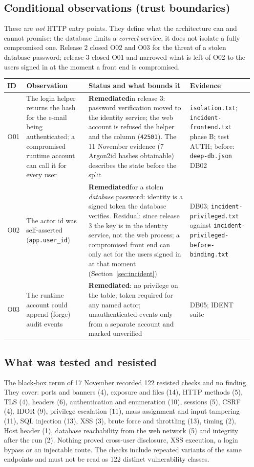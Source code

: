 \documentclass[10pt,a4paper]{article}
\newcommand{\code}[1]{\nolinkurl{#1}}
\newcommand{\fixed}{\textcolor{okgreen}{\textbf{Remediated}}}
\newcommand{\tcap}[1]{\captionof{table}{#1}\nopagebreak[4]\vspace{-3pt}}
\begin{document}
\subsection{Conditional observations (trust boundaries)}
These are \emph{not} HTTP entry points. They define what the architecture can and cannot promise: the database limits a \emph{correct} service, it does not isolate a fully compromised one. Release 2 closed O02 and O03 for the threat of a stolen database password; release 3 closed O01 and narrowed what is left of O02 to the users signed in at the moment a front end is compromised.
\tcap{Conditional observations O01--O03}
\begin{center}\small
\begin{tabularx}{\linewidth}{@{}L{0.9cm}YYL{3.4cm}@{}}
\toprule\textbf{ID} & \textbf{Observation} & \textbf{Status and what bounds it} & \textbf{Evidence}\\\midrule
O01 & The login helper returns the hash for the e-mail being authenticated; a compromised runtime account can call it for every user & \fixed in release 3: password verification moved to the identity service; the web account is refused the helper and the column (\code{42501}). The 11 November evidence (7 Argon2id hashes obtainable) describes the state before the split & \code{isolation.txt}; \code{incident-frontend.txt} phase B; test AUTH; before: \code{deep-db.json} DB02\\
O02 & The actor id was self-asserted (\code{app.user_id}) & \fixed for a stolen \emph{database} password: identity is a signed token the database verifies. Residual: since release 3 the key is in the identity service, not the web process; a compromised front end can only act for the users signed in at that moment (Section~\ref{sec:incident}) & DB03; \code{incident-privileged.txt} against \code{incident-privileged-before-binding.txt}\\
O03 & The runtime account could append (forge) audit events & \fixed: no privilege on the table; token required for any named actor; unauthenticated events only from a separate account and marked unverified & DB05; IDENT suite\\
\bottomrule\end{tabularx}\end{center}

\subsection{What was tested and resisted}
The black-box rerun of 17 November recorded 122 resisted checks and no finding. They cover: ports and banners (4), exposure and files (14), HTTP methods (5), TLS (4), headers (6), authentication and enumeration (10), sessions (5), CSRF (4), IDOR (9), privilege escalation (11), mass assignment and input tampering (11), SQL injection (13), XSS (3), brute force and throttling (13), timing (2), Host header (1), database reachability from the web network (5) and integrity after the run (2). Nothing proved cross-user disclosure, XSS execution, a login bypass or an injectable route. The checks include repeated variants of the same endpoints and must not be read as 122 distinct vulnerability classes.
\end{document}
